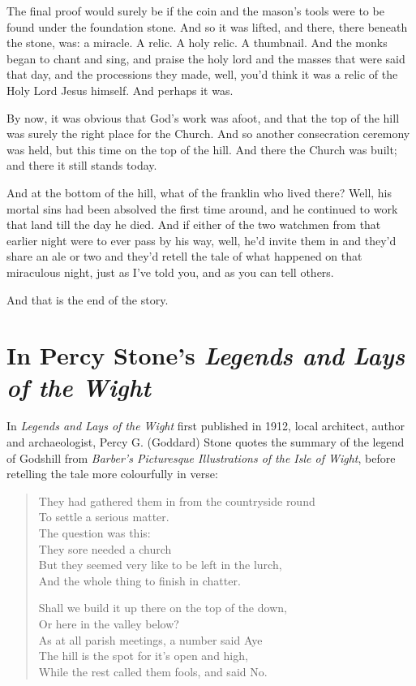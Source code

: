 \documentclass[
  12pt,
  a5paper,
  twoside]{book}
\begin{document}
The final proof would surely be if the coin and the mason's tools were
to be found under the foundation stone. And so it was lifted, and there,
there beneath the stone, was: a miracle. A relic. A holy relic. A
thumbnail. And the monks began to chant and sing, and praise the holy
lord and the masses that were said that day, and the processions they
made, well, you'd think it was a relic of the Holy Lord Jesus himself.
And perhaps it was.

By now, it was obvious that God's work was afoot, and that the top of
the hill was surely the right place for the Church. And so another
consecration ceremony was held, but this time on the top of the hill.
And there the Church was built; and there it still stands today.

And at the bottom of the hill, what of the franklin who lived there?
Well, his mortal sins had been absolved the first time around, and he
continued to work that land till the day he died. And if either of the
two watchmen from that earlier night were to ever pass by his way, well,
he'd invite them in and they'd share an ale or two and they'd retell the
tale of what happened on that miraculous night, just as I've told you,
and as you can tell others.

And that is the end of the story.


\chapter{\texorpdfstring{In Percy Stone's \emph{Legends and Lays of the
Wight}}{In Percy Stone's Legends and Lays of the Wight}}\label{in-percy-stones-legends-and-lays-of-the-wight}

In \emph{Legends and Lays of the Wight} first published in 1912, local
architect, author and archaeologist, Percy G. (Goddard) Stone quotes the
summary of the legend of Godshill from \emph{Barber's Picturesque
Illustrations of the Isle of Wight}, before retelling the tale more
colourfully in verse:

\begin{quote}
They had gathered them in from the countryside round\\
To settle a serious matter.\\
The question was this:\\
They sore needed a church\\
But they seemed very like to be left in the lurch,\\
And the whole thing to finish in chatter.

Shall we build it up there on the top of the down,\\
Or here in the valley below?\\
As at all parish meetings, a number said Aye\\
The hill is the spot for it's open and high,\\
While the rest called them fools, and said No.~
\end{quote}
\end{document}
